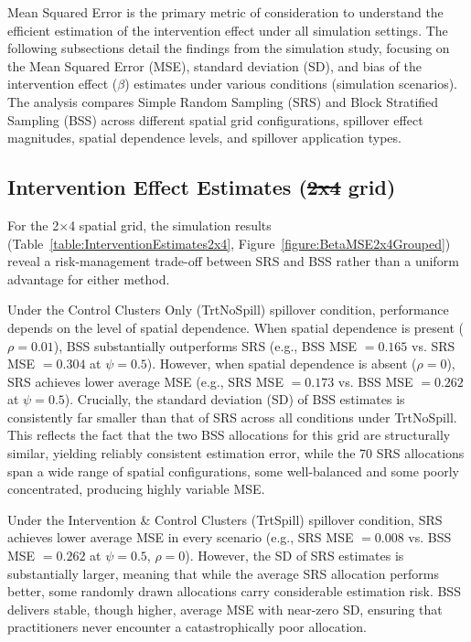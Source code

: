 \documentclass{article}[11pt]
\makeatletter
\providecommand{\DIFaddtex}[1]{{\protect\color{blue}\uwave{#1}}} %
\providecommand{\DIFdeltex}[1]{{\protect\color{red}\sout{#1}}} %
\providecommand{\DIFaddbegin}{} %
\providecommand{\DIFaddend}{} %
\providecommand{\DIFdelbegin}{} %
\providecommand{\DIFdelend}{} %
\providecommand{\DIFadd}[1]{\texorpdfstring{\DIFaddtex{#1}}{#1}} %
\providecommand{\DIFdel}[1]{\texorpdfstring{\DIFdeltex{#1}}{}} %
\providecommand{\DIFscaledelfig}{0.5}
\newlength{\DIFdelgraphicswidth} %
\newlength{\DIFdelgraphicsheight} %
\providecommand{\DIFaddincludegraphics}[2][]{{\color{blue}\fbox{\DIFOincludegraphics[#1]{#2}}}} %
\providecommand{\DIFdelincludegraphics}[2][]{%
\sbox{\DIFdelgraphicsbox}{\DIFOincludegraphics[#1]{#2}}%
\settoboxwidth{\DIFdelgraphicswidth}{\DIFdelgraphicsbox} %
\settoboxtotalheight{\DIFdelgraphicsheight}{\DIFdelgraphicsbox} %
\scalebox{\DIFscaledelfig}{%
\parbox[b]{\DIFdelgraphicswidth}{\usebox{\DIFdelgraphicsbox}\\[-\baselineskip] \rule{\DIFdelgraphicswidth}{0em}}\llap{\resizebox{\DIFdelgraphicswidth}{\DIFdelgraphicsheight}{%
\setlength{\unitlength}{\DIFdelgraphicswidth}%
\begin{picture}(1,1)%
\thicklines\linethickness{2pt} %
{\color[rgb]{1,0,0}\put(0,0){\framebox(1,1){}}}%
{\color[rgb]{1,0,0}\put(0,0){\line( 1,1){1}}}%
{\color[rgb]{1,0,0}\put(0,1){\line(1,-1){1}}}%
\end{picture}%
}\hspace*{3pt}}} %
} %
\DeclareRobustCommand{\DIFaddbegin}{\DIFOaddbegin \let\includegraphics\DIFaddincludegraphics} %
\DeclareRobustCommand{\DIFaddend}{\DIFOaddend \let\includegraphics\DIFOincludegraphics} %
\DeclareRobustCommand{\DIFdelbegin}{\DIFOdelbegin \let\includegraphics\DIFdelincludegraphics} %
\DeclareRobustCommand{\DIFdelend}{\DIFOaddend \let\includegraphics\DIFOincludegraphics} %
\let\sout@orig\sout %
\renewcommand{\sout}[1]{\ifmmode\text{\sout@orig{\ensuremath{#1}}}\else\sout@orig{#1}\fi} %
\makeatother
\begin{document}
Mean Squared Error is the primary metric of consideration to understand the efficient estimation of the intervention effect under all simulation settings. The following subsections detail the findings from the simulation study, focusing on the Mean Squared Error (MSE), standard deviation (SD), and bias of the intervention effect ($\beta$) estimates under various conditions (simulation scenarios). The analysis compares Simple Random Sampling (SRS) and Block Stratified Sampling (BSS) across different spatial grid configurations, spillover effect magnitudes, spatial dependence levels, and spillover application types.

\subsection{Intervention Effect Estimates (\DIFdelbegin \DIFdel{2x4 }\DIFdelend \DIFaddbegin \DIFadd{$2\times4$ }\DIFaddend grid)}

For the 2$\times$4 spatial grid, the simulation results (Table~\ref{table:InterventionEstimates2x4}, Figure~\ref{figure:BetaMSE2x4Grouped}) reveal a risk-management trade-off between SRS and BSS rather than a uniform advantage for either method.

Under the Control Clusters Only (TrtNoSpill) spillover condition, performance depends on the level of spatial dependence. When spatial dependence is present ($\rho = 0.01$), BSS substantially outperforms SRS (e.g., BSS MSE $= 0.165$ vs. SRS MSE $= 0.304$ at $\psi = 0.5$). However, when spatial dependence is absent ($\rho = 0$), SRS achieves lower average MSE (e.g., SRS MSE $= 0.173$ vs. BSS MSE $= 0.262$ at $\psi = 0.5$). Crucially, the standard deviation (SD) of BSS estimates is consistently far smaller than that of SRS across all conditions under TrtNoSpill. This reflects the fact that the two BSS allocations for this grid are structurally similar, yielding reliably consistent estimation error, while the 70 SRS allocations span a wide range of spatial configurations, some well-balanced and some poorly concentrated, producing highly variable MSE.

Under the Intervention \& Control Clusters (TrtSpill) spillover condition, SRS achieves lower average MSE in every scenario (e.g., SRS MSE $= 0.008$ vs. BSS MSE $= 0.262$ at $\psi = 0.5$, $\rho = 0$). However, the SD of SRS estimates is substantially larger, meaning that while the average SRS allocation performs better, some randomly drawn allocations carry considerable estimation risk. BSS delivers stable, though higher, average MSE with near-zero SD, ensuring that practitioners never encounter a catastrophically poor allocation.
\end{document}
